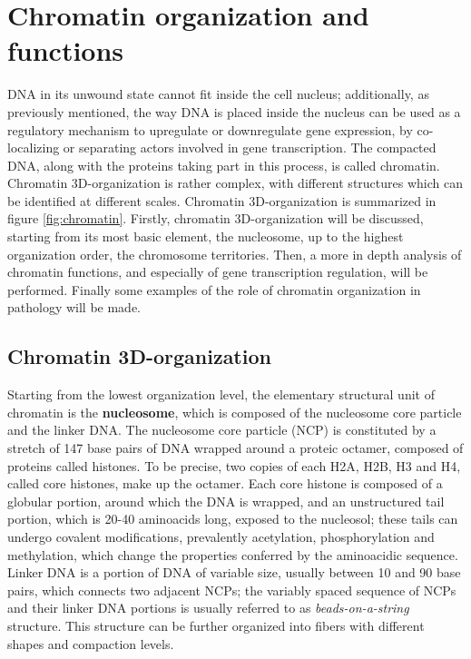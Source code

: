 \section{Chromatin organization and functions}

DNA in its unwound state cannot fit inside the cell nucleus; additionally, as previously mentioned, the way DNA is placed inside the nucleus can be used as a regulatory mechanism to upregulate or downregulate gene expression, by co-localizing or separating actors involved in gene transcription. The compacted DNA, along with the proteins taking part in this process, is called chromatin. Chromatin 3D-organization is rather complex, with different structures which can be identified at different scales\cite{chromatinorganization2019, chromatindevelopment2019}. Chromatin 3D-organization is summarized in figure \ref{fig:chromatin}. Firstly, chromatin 3D-organization will be discussed, starting from its most basic element, the nucleosome, up to the highest organization order, the chromosome territories. Then, a more in depth analysis of chromatin functions, and especially of gene transcription regulation, will be performed. Finally some examples of the role of chromatin organization in pathology will be made.

\subsection{Chromatin 3D-organization}

Starting from the lowest organization level, the elementary structural unit of chromatin is the \textbf{nucleosome}, which is composed of the nucleosome core particle and the linker DNA. The nucleosome core particle (NCP) is constituted by a stretch of 147 base pairs of DNA wrapped around a proteic octamer, composed of proteins called histones. To be precise, two copies of each H2A, H2B, H3 and H4, called core histones, make up the octamer\cite{nucleosomecore1997}. Each core histone is composed of a globular portion, around which the DNA is wrapped, and an unstructured tail portion, which is 20-40 aminoacids long, exposed to the nucleosol; these tails can undergo covalent modifications, prevalently acetylation, phosphorylation and methylation, which change the properties conferred by the aminoacidic sequence\cite{histonemodifications2020}. Linker DNA is a portion of DNA of variable size, usually between 10 and 90 base pairs, which connects two adjacent NCPs; the variably spaced sequence of NCPs and their linker DNA portions is usually referred to as \emph{beads-on-a-string} structure. This structure can be further organized into fibers with different shapes and compaction levels\cite{chromatinfiber2015}.

